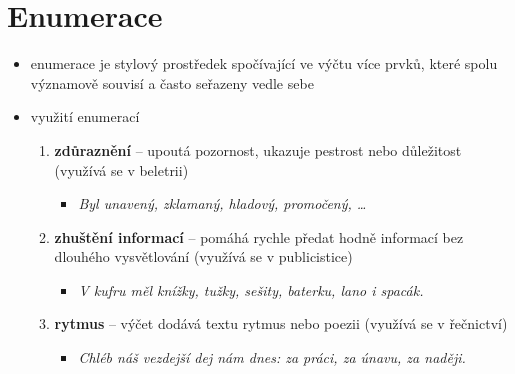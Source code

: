 \documentclass{memoir}
\begin{document}
\section*{Enumerace}
	\begin{itemize}
		\item enumerace je stylový prostředek spočívající ve výčtu více prvků, které spolu významově souvisí a často seřazeny vedle sebe
		\item využití enumerací
		\begin{enumerate}
			\item \textbf{zdůraznění} -- upoutá pozornost, ukazuje pestrost nebo důležitost (využívá se v beletrii)
			\begin{itemize}
				\item \textit{Byl unavený, zklamaný, hladový, promočený, \dots}
			\end{itemize}
			\item \textbf{zhuštění informací} -- pomáhá rychle předat hodně informací bez dlouhého vysvětlování (využívá se v publicistice)
			\begin{itemize}
				\item \textit{V kufru měl knížky, tužky, sešity, baterku, lano i spacák.}
			\end{itemize}
			\item \textbf{rytmus} -- výčet dodává textu rytmus nebo poezii (využívá se v řečnictví)
			\begin{itemize}
				\item \textit{Chléb náš vezdejší dej nám dnes: za práci, za únavu, za naději.}
			\end{itemize}
		\end{enumerate}
	\end{itemize}
\end{document}
